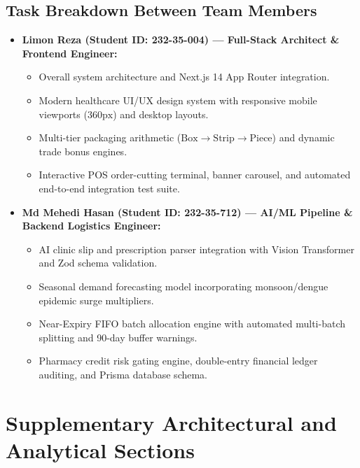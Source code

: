 \documentclass[12pt,a4paper]{article}
\begin{document}
\subsection{Task Breakdown Between Team Members}
\begin{itemize}
    \item \textbf{Limon Reza (Student ID: 232-35-004) --- Full-Stack Architect \& Frontend Engineer:}
    \begin{itemize}
        \item Overall system architecture and Next.js 14 App Router integration.
        \item Modern healthcare UI/UX design system with responsive mobile viewports ($360\text{px}$) and desktop layouts.
        \item Multi-tier packaging arithmetic ($\text{Box} \to \text{Strip} \to \text{Piece}$) and dynamic trade bonus engines.
        \item Interactive POS order-cutting terminal, banner carousel, and automated end-to-end integration test suite.
    \end{itemize}
    \item \textbf{Md Mehedi Hasan (Student ID: 232-35-712) --- AI/ML Pipeline \& Backend Logistics Engineer:}
    \begin{itemize}
        \item AI clinic slip and prescription parser integration with Vision Transformer and Zod schema validation.
        \item Seasonal demand forecasting model incorporating monsoon/dengue epidemic surge multipliers.
        \item Near-Expiry FIFO batch allocation engine with automated multi-batch splitting and 90-day buffer warnings.
        \item Pharmacy credit risk gating engine, double-entry financial ledger auditing, and Prisma database schema.
    \end{itemize}
\end{itemize}

\section{Supplementary Architectural and Analytical Sections}
\end{document}
